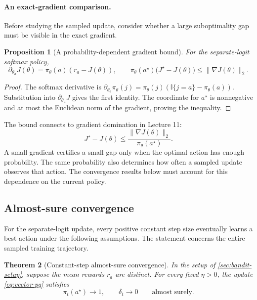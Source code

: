 \documentclass[11pt,twoside]{article}
\newcommand{\I}{\mathbb I}
\newtheorem{theorem}{Theorem}[section]
\newtheorem{proposition}[theorem]{Proposition}
\theoremstyle{definition}
\theoremstyle{remark}
\begin{document}
\paragraph{An exact-gradient comparison.}
Before studying the sampled update, consider whether a large suboptimality gap
must be visible in the exact gradient.

\begin{proposition}[A probability-dependent gradient bound]
\label{prop:gradient-gap}
For the separate-logit softmax policy,
\begin{equation}
 \partial_{\theta_a}J(\theta)=\pi_\theta(a)(r_a-J(\theta)),
 \qquad
 \pi_\theta(a^\star)\bigl(J^\star-J(\theta)\bigr)
 \le\|\nabla J(\theta)\|_2.
 \label{eq:gradient-gap}
\end{equation}
\end{proposition}
\begin{proof}
The softmax derivative is
$\partial_{\theta_a}\pi_\theta(j)=\pi_\theta(j)
(\I\{j=a\}-\pi_\theta(a))$.
Substitution into $\partial_{\theta_a}J$ gives the first identity.
The coordinate for $a^\star$ is nonnegative and at most the Euclidean norm
of the gradient, proving the inequality.
\end{proof}

The bound connects to gradient domination in Lecture 11:
\[
 J^\star-J(\theta)\le
 \frac{\|\nabla J(\theta)\|_2}{\pi_\theta(a^\star)}.
\]
A small gradient certifies a small gap only when the optimal action has
enough probability. The same probability also determines how often a
sampled update observes that action. The convergence results below must
account for this dependence on the current policy.

\subsection{Almost-sure convergence}
\label{sec:time}

For the separate-logit update, every positive constant step size eventually
learns a best action under the following assumptions. The statement concerns
the entire sampled training trajectory.

\begin{theorem}[Constant-step almost-sure convergence]
\label{thm:as}
In the setup of \cref{sec:bandit-setup}, suppose the mean rewards $r_a$
are distinct. For every fixed $\eta>0$, the update \cref{eq:vector-pg}
satisfies
\[
 \pi_t(a^\star)\longrightarrow1,
 \qquad \delta_t\longrightarrow0
 \qquad\text{almost surely}.
\]
\end{theorem}
\end{document}
